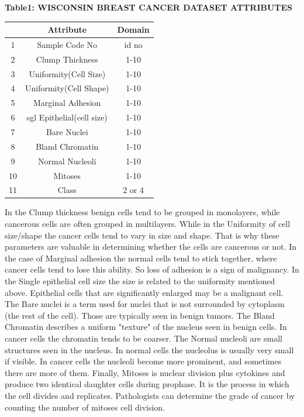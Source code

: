 \documentclass[conference]{IEEEtran}
\begin{document}
 \begin{center}
     \textbf{Table1: WISCONSIN BREAST CANCER DATASET ATTRIBUTES}
  \end{center}

    \begin{tabular}{|c|c|c|}
      \hline
      & Attribute & Domain\\
      \hline
      1 & Sample Code No & id no\\
      \hline
      2 & Clump Thickness & 1-10\\
      \hline
      3 & Uniformity(Cell Size) & 1-10\\
      \hline
      4 & Uniformity(Cell Shape) & 1-10\\
       \hline
      5 & Marginal Adhesion & 1-10\\
       \hline
      6 & sgl Epithelial(cell size) & 1-10\\
       \hline
      7 & Bare Nuclei & 1-10\\
       \hline
      8  & Bland Chromatin & 1-10\\
       \hline
      9 & Normal Nucleoli & 1-10\\
       \hline
      10 & Mitoses & 1-10\\
       \hline
      11 & Class & 2 or 4\\
      \hline
    \end{tabular}

\vspace{.5 cm}
In the Clump thickness benign cells tend to be grouped in monolayers, while cancerous cells are often grouped in multilayers. While in the Uniformity of cell size/shape the cancer cells tend to vary in size and shape. That is why these parameters are valuable in determining whether the cells are cancerous or not. In the case of Marginal adhesion the normal cells tend to stick together, where cancer cells tend to lose this ability. So loss of adhesion is a sign of malignancy. In the Single epithelial cell size the size is related to the uniformity
mentioned above. Epithelial cells that are significantly enlarged may be a malignant cell. The Bare nuclei is a term used for nuclei that is not surrounded by cytoplasm (the rest of the cell). Those are typically seen in benign tumors. The Bland Chromatin describes a uniform "texture" of the nucleus seen in benign cells. In cancer cells the chromatin tends to be coarser. The Normal nucleoli are small structures seen in the nucleus. In normal cells the nucleolus is usually very small if visible. In cancer cells the nucleoli become more prominent, and sometimes there are more of them. Finally, Mitoses is nuclear division plus cytokines and produce two identical daughter cells during prophase. It is the process in which the cell divides and replicates. Pathologists can determine the grade of cancer by counting the number of mitoses cell division.
\end{document}

